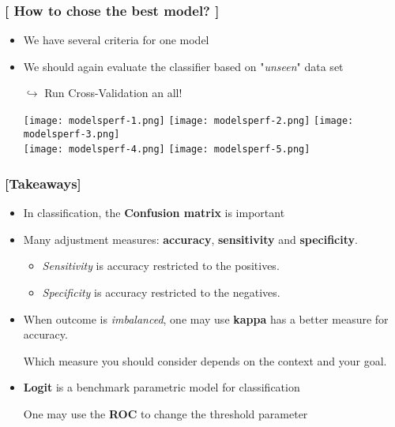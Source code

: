 \documentclass[xcolor=x11names,compress, aspectratio=169]{beamer}
\renewcommand{\(}{\begin{columns}}
\renewcommand{\)}{\end{columns}}
\newcommand{\<}[1]{\begin{column}{#1}}
\renewcommand{\>}{\end{column}}
\begin{document}
\begin{frame} %
\frametitle{\textcolor{brique}{[ How to chose the best model? ]}}
\pause
 \begin{itemize}[<+->]
  \item We have several criteria for one model
  \item  We should again  evaluate the classifier based  on   "\textit{unseen}" data set
  \item[$\hookrightarrow$] Run Cross-Validation an all!
   \item[]\texttt{[image: modelsperf-1.png]} \texttt{[image: modelsperf-2.png]} \texttt{[image: modelsperf-3.png]} \\
   \texttt{[image: modelsperf-4.png]} \texttt{[image: modelsperf-5.png]}
\end{itemize}
\end{frame}





\begin{frame} %
\frametitle{\textcolor{brique}{[Takeaways]}}
\begin{itemize}[<+->]
\item In classification, the \textbf{Confusion matrix} is important
 \item Many adjustment measures:  \textbf{accuracy}, \textbf{sensitivity} and \textbf{specificity}.
    \begin{itemize}[<+->]
      \item \textit{Sensitivity} is accuracy restricted to the positives.
      \item \textit{Specificity} is accuracy restricted to the negatives.
   \end{itemize}
 \item When  outcome is \textit{imbalanced}, one may use \textbf{kappa} has a better measure for accuracy.
  \item[] Which measure you should consider depends on the context and your goal.
 \item \textbf{Logit} is a benchmark parametric model for classification
 \item[] One may use the \textbf{ROC} to change the threshold parameter
\end{itemize}
\end{frame}
\end{document}
